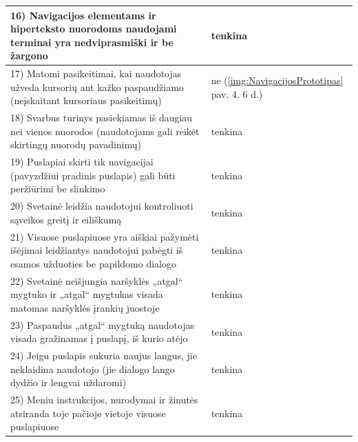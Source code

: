 \documentclass{VUMIFPSkursinis}
\begin{document}
\begin{longtable}{ |p{}|p{}| }
	16) Navigacijos elementams ir hiperteksto nuorodoms naudojami terminai yra nedviprasmiški ir be žargono & tenkina \\ \hline
	17) Matomi pasikeitimai, kai naudotojas užveda kursorių ant kažko paspaudžiamo (neįskaitant kursoriaus pasikeitimų) & ne (\ref{img:NavigacijosPrototipas} pav. 4, 6 d.) \\ \hline
	18) Svarbus turinys pasiekiamas iš daugiau nei vienos nuorodos (naudotojams gali reikėt skirtingų nuorodų pavadinimų) & tenkina \\ \hline
	19) Puslapiai skirti tik navigacijai (pavyzdžiui pradinis puslapis) gali būti peržiūrimi be slinkimo & tenkina \\ \hline
	20) Svetainė leidžia naudotojui kontroliuoti sąveikos greitį ir eiliškumą & tenkina \\ \hline
	21) Visuose puslapiuose yra aiškiai pažymėti išėjimai leidžiantys naudotojui pabėgti iš esamos užduoties be papildomo dialogo & tenkina \\ \hline
	22) Svetainė neišjungia naršyklės „atgal“ mygtuko ir „atgal“ mygtukas visada matomas naršyklės įrankių juostoje & tenkina \\ \hline
	23) Paspaudus „atgal“ mygtuką naudotojas visada gražinamas į puslapį, iš kurio atėjo & tenkina \\ \hline
	24) Jeigu puslapis sukuria naujus langus, jie neklaidina naudotojo (jie dialogo lango dydžio ir lengvai uždaromi) & tenkina \\ \hline
	25) Meniu instrukcijos, nurodymai ir žinutės atsiranda toje pačioje vietoje visuose puslapiuose & tenkina \\ \hline
\end{longtable}
\label{NavigacijosirIALentelėPrad}
\addtocounter{table}{-1}
\setlength{\parindent}{1cm}
\end{document}
